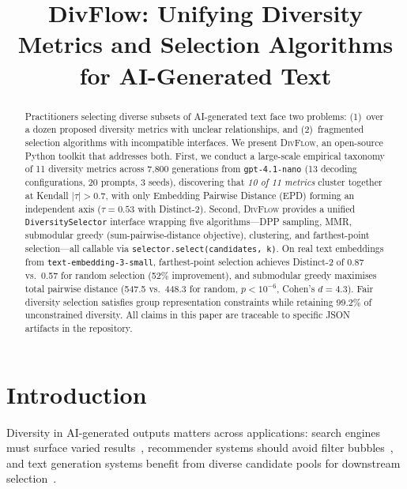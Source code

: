 \documentclass[11pt]{article}
\title{\textbf{DivFlow: Unifying Diversity Metrics and Selection Algorithms\\for AI-Generated Text}}
\date{}
\begin{document}
\maketitle

\begin{abstract}
Practitioners selecting diverse subsets of AI-generated text face two problems:
(1)~over a dozen proposed diversity metrics with unclear relationships, and
(2)~fragmented selection algorithms with incompatible interfaces.
We present \textsc{DivFlow}, an open-source Python toolkit that addresses both.
First, we conduct a large-scale empirical taxonomy of 11 diversity metrics
across 7{,}800 generations from \texttt{gpt-4.1-nano} (13 decoding configurations,
20 prompts, 3 seeds), discovering that \emph{10 of 11 metrics} cluster
together at Kendall $|\tau| > 0.7$, with only Embedding Pairwise Distance
(EPD) forming an independent axis ($\tau = 0.53$ with Distinct-2).
Second, \textsc{DivFlow} provides a unified \texttt{DiversitySelector}
interface wrapping five algorithms---DPP sampling, MMR, submodular
greedy (sum-pairwise-distance objective), clustering, and farthest-point
selection---all callable via \texttt{selector.select(candidates, k)}.
On real text embeddings from \texttt{text-embedding-3-small},
farthest-point selection achieves Distinct-2 of 0.87 vs.\ 0.57 for
random selection (52\% improvement), and submodular greedy maximises
total pairwise distance (547.5 vs.\ 448.3 for random, $p < 10^{-6}$,
Cohen's $d = 4.3$).
Fair diversity selection satisfies group representation constraints
while retaining 99.2\% of unconstrained diversity.
All claims in this paper are traceable to specific JSON artifacts
in the repository.
\end{abstract}

\section{Introduction}
\label{sec:intro}

Diversity in AI-generated outputs matters across applications:
search engines must surface varied results~\citep{carbonell1998mmr},
recommender systems should avoid filter bubbles~\citep{pariser2011filter},
and text generation systems benefit from diverse candidate pools
for downstream selection~\citep{ippolito2019comparison,vijayakumar2018diverse}.
\end{document}
